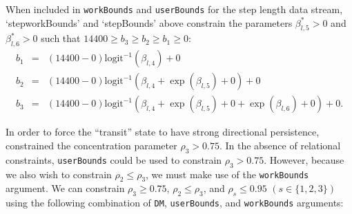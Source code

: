 \documentclass[12pt]{article}\usepackage[]{graphicx}\usepackage[]{xcolor}
\begin{document}
When included in \verb|workBounds| and \verb|userBounds| for the step length data stream, `stepworkBounds' and `stepBounds' above constrain the parameters $\beta^*_{l,5}>0$ and $\beta^*_{l,6}>0$ such that $14400 \ge b_3 \ge b_2 \ge b_1 \ge 0$:
\begin{eqnarray*}
b_1 &=& \left(14400-0\right) \text{logit}^{-1} \left( \beta_{l,4} \right) + 0 \\
b_2 &=& \left(14400-0\right) \text{logit}^{-1} \left( \beta_{l,4} + \exp(\beta_{l,5}) + 0 \right) + 0 \\
b_3 &=& \left(14400-0\right) \text{logit}^{-1} \left( \beta_{l,4} + \exp(\beta_{l,5}) + 0 + \exp(\beta_{l,6}) + 0\right) + 0.
\end{eqnarray*}

In order to force the ``transit'' state to have strong directional persistence, \cite{McClintockEtAl2013c} constrained the concentration parameter $\rho_3>0.75$. In the absence of relational constraints, \verb|userBounds| could be used to constrain $\rho_3>0.75$.  However, because we also wish to constrain  $\rho_2 \le \rho_3$, we must make use of the \verb|workBounds| argument.  We can constrain $\rho_3 \ge 0.75$, $\rho_2 \le \rho_3$, and $\rho_s \le 0.95$ $(s \in \{ 1,2,3 \})$ using the following combination of \verb|DM|, \verb|userBounds|, and \verb|workBounds| arguments:
\end{document}
